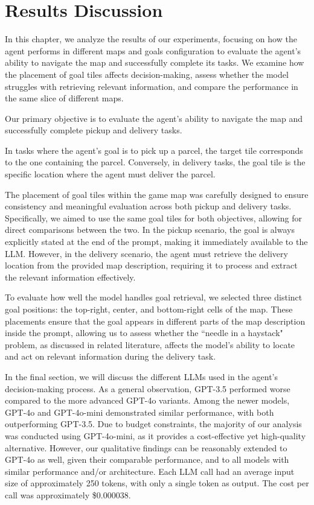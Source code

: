 \chapter{Results Discussion}
\label{cha:results_discussion}

In this chapter, we analyze the results of our experiments, focusing on how the
agent performs in different maps and goals configuration to evaluate the agent's
ability to navigate the map and successfully complete its tasks. We examine how the
placement of goal tiles affects decision-making, assess whether the model
struggles with retrieving relevant information, and compare the performance in the
same slice of different maps.

Our primary objective is to evaluate the agent's ability to navigate the map and
successfully complete pickup and delivery tasks.

In tasks where the agent's goal is to pick up a parcel, the target tile
corresponds to the one containing the parcel. Conversely, in delivery tasks, the
goal tile is the specific location where the agent must deliver the parcel.

The placement of goal tiles within the game map was carefully designed to ensure
consistency and meaningful evaluation across both pickup and delivery tasks.
Specifically, we aimed to use the same goal tiles for both objectives, allowing
for direct comparisons between the two. In the pickup scenario, the goal is
always explicitly stated at the end of the prompt, making it immediately available
to the LLM. However, in the delivery scenario, the agent must retrieve the
delivery location from the provided map description, requiring it to process and
extract the relevant information effectively.

To evaluate how well the model handles goal retrieval, we selected three
distinct goal positions: the top-right, center, and bottom-right cells of the map.
These placements ensure that the goal appears in different parts of the map
description inside the prompt, allowing us to assess whether the ``needle in a haystack"
problem, as discussed in related literature, affects the model's ability to
locate and act on relevant information during the delivery task.

In the final section, we will discuss the different LLMs used in the agent's decision-making
process. As a general observation, GPT-3.5 performed worse compared to the more advanced
GPT-4o variants. Among the newer models, GPT-4o and GPT-4o-mini demonstrated similar
performance, with both outperforming GPT-3.5. Due to budget constraints, the
majority of our analysis was conducted using GPT-4o-mini, as it provides a cost-effective
yet high-quality alternative. However, our qualitative findings can be reasonably
extended to GPT-4o as well, given their comparable performance, and to all models
with similar performance and/or architecture. Each LLM call had an average input
size of approximately 250 tokens, with only a single token as output. The cost
per call was approximately \$0.000038.

